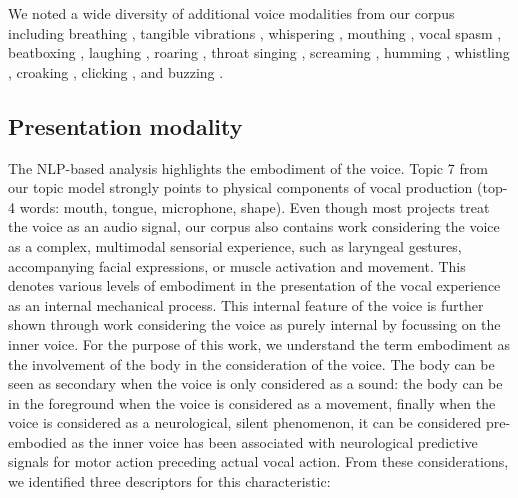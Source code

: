 \documentclass[sigconf]{nimeart}
\begin{document}
We noted a wide diversity of additional voice modalities from our corpus including breathing \cite{nagashima2003bio,jaimovich2016emovere,kiefer2018towards,kleinberger2018vocal,alarcon2019intimal,cotton2021body,li2021wearable}, tangible vibrations \cite{andersson2013designing,kleinberger2018vocal,poepel2014design,kiefer2018towards,cotton2021body,holbrow2014vocal}, whispering \cite{brown2015rawr,lind2018animated,bergsland2011six}, mouthing \cite{mclean2013paralinguistic,lyons2020designing}, vocal spasm \cite{d2011room}, beatboxing \cite{lui2013compact,fasciani2012voice}, laughing \cite{oh2013lolol}, roaring \cite{brown2015rawr}, throat singing \cite{wu2017towards}, screaming \cite{lind2018animated}, humming \cite{lind2018animated}, whistling \cite{chandran2018interface}, croaking \cite{schedel2021rhumbline}, clicking \cite{villicana2021speculator}, and buzzing \cite{villicana2021speculator}.

\subsection{Presentation modality}\label{presentation-modality}

The NLP-based analysis highlights the embodiment of the voice. Topic 7 from our topic model strongly points to physical components of vocal production (top-4 words: mouth, tongue, microphone, shape). Even though most projects treat the voice as an audio signal, our corpus also contains work considering the voice as a complex, multimodal sensorial experience, such as laryngeal gestures, accompanying facial expressions, or muscle activation and movement. This denotes various levels of embodiment in the presentation of the vocal experience as an internal mechanical process. This internal feature of the voice is further shown through work considering the voice as purely internal by focussing on the inner voice. For the purpose of this work, we understand the term embodiment as the involvement of the body in the consideration of the voice. The body can be seen as secondary when the voice is only considered as a sound: the body can be in the foreground when the voice is considered as a movement, finally when the voice is considered as a neurological, silent phenomenon, it can be considered pre-embodied as the inner voice has been associated with neurological predictive signals for motor action preceding actual vocal action. From these considerations, we identified three descriptors for this characteristic:
\end{document}

